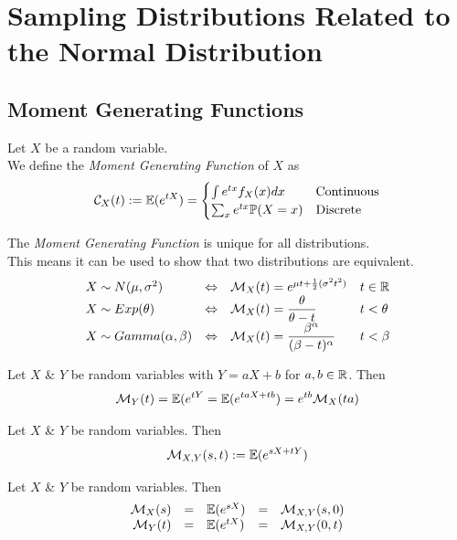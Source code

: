 \documentclass[11pt,a4paper]{article}
\begin{document}
\section{Sampling Distributions Related to the Normal Distribution}

\subsection{Moment Generating Functions}

Let $X$ be a random variable.\\
We define the \textit{Moment Generating Function} of $X$ as
$$\mathcal{C}_X(t):=\mathbb{E}(e^{tX})=\begin{cases}\int e^{tx}f_X(x)dx&\mathrm{Continuous}\\\sum_xe^{tx}\mathbb{P}(X=x)&\mathrm{Discrete}\end{cases}$$

The \textit{Moment Generating Function} is unique for all distributions.\\
This means it can be used to show that two distributions are equivalent.\\

\[\begin{array}{lcll}
X\sim N(\mu,\sigma^2)&\Leftrightarrow&\mathcal{M}_X(t)=e^{\mu t+\frac{1}{2}(\sigma^2t^2)}&t\in\mathbb{R}\\
X\sim Exp(\theta)&\Leftrightarrow&\mathcal{M}_X(t)=\dfrac{\theta}{\theta-t}&t<\theta\\
X\sim Gamma(\alpha,\beta)&\Leftrightarrow&\mathcal{M}_X(t)=\dfrac{\beta^\alpha}{(\beta-t)^\alpha}&t<\beta
\end{array}\]

Let $X$ \& $Y$ be random variables with $Y=aX+b$ for $a,b\in\mathbb{R}$. Then
$$\mathcal{M}_Y(t)=\mathbb{E}(e^{tY}=\mathbb{E}(e^{taX+tb})=e^{tb}\mathcal{M}_X(ta)$$

Let $X$ \& $Y$ be random variables. Then
$$\mathcal{M}_{X,Y}(s,t):=\mathbb{E}(e^{sX+tY})$$

Let $X$ \& $Y$ be random variables. Then
\[\begin{array}{rclcl}
\mathcal{M}_X(s)&=&\mathbb{E}(e^{sX})&=&\mathcal{M}_{X,Y}(s,0)\\
\mathcal{M}_Y(t)&=&\mathbb{E}(e^{tX})&=&\mathcal{M}_{X,Y}(0,t)
\end{array}\]
\end{document}
